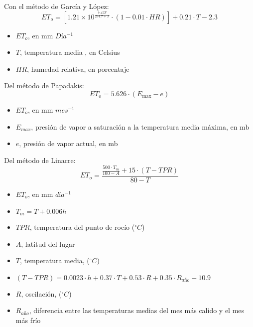         Con el método de García y López:
        \begin{equation}
            ET_o = \left[1.21 \times 10^{\frac{7.45T}{234.7 +T}} \cdot \left(1-0.01 \cdot HR \right) \right] + 0.21 \cdot T -2.3
        \end{equation}
        \begin{notation}
            \begin{itemize}
                \item $ET_o$, en mm $Día^{-1}$
                \item $T$, temperatura media , en Celsius 
                \item $HR$, humedad relativa, en porcentaje
            \end{itemize}
        \end{notation}
        Del método de Papadakis:
        \begin{equation}
            ET_o = 5.626 \cdot \left(E_{\max } -e\right)
        \end{equation}
        \begin{notation}
            \begin{itemize}
                \item $ET_o$, en mm $mes^{-1}$
                \item $E_{max}$, presión de vapor a saturación a la temperatura media máxima, en mb
                \item $e$, presión de vapor actual, en mb
            \end{itemize}
        \end{notation}
        
        Del método de Linacre:
        \begin{equation}
            ET_o = \frac{\frac{500 \cdot T_m}{100 -A} + 15 \cdot \left(T- TPR\right)}{80 -T}
        \end{equation}
        \begin{notation}
            \begin{itemize}
                \item $ET_o$, en mm $día^{-1}$
                \item $T_m=T+0.006h$
                \item $TPR$,  temperatura del punto de rocío ($^{\circ}C$)
                \item $A$, latitud del lugar
                \item $T$, temperatura media, ($^{\circ}C$)
                \item $(T-TPR)=0.0023\cdot h+0.37\cdot T+0.53\cdot R+0.35\cdot R_{año}-10.9$
                \item $R$, oscilación, ($^{\circ}C$)
                \item $R_{año}$, diferencia entre las temperaturas medias del mes más calido y el mes más frío
            \end{itemize}
        \end{notation}
        
